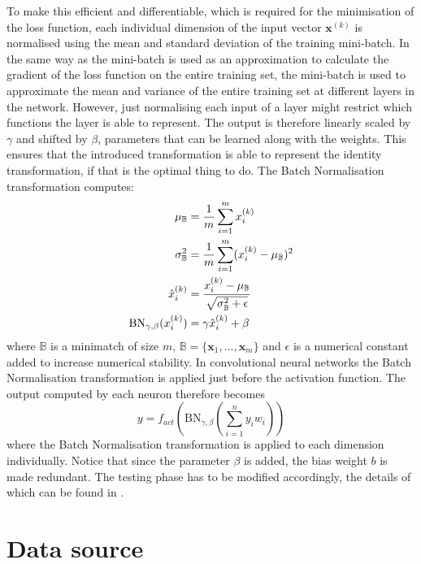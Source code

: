 \documentclass[12pt,a4paper,twoside,openright]{report}
\begin{document}
To make this efficient and differentiable, which is required for the minimisation of the loss function, each individual dimension of the input vector $\textbf{x}^{(k)}$ is normalised using the mean and standard deviation of the training mini-batch. In the same way as the mini-batch is used as an approximation to calculate the gradient of the loss function on the entire training set, the mini-batch is used to approximate the mean and variance of the entire training set at different layers in the network. However, just normalising each input of a layer might restrict which functions the layer is able to represent. The output is therefore linearly scaled by $\gamma$ and shifted by $\beta$, parameters that can be learned along with the weights. This ensures that the introduced transformation is able to represent the identity transformation, if that is the optimal thing to do. The Batch Normalisation transformation computes:
\begin{equation}
\begin{split}
	\mu_{\mathbb{B}}  & = \frac{1}{m}\sum_{i=1}^m x^{(k)}_i \\	
	\sigma^2_{\mathbb{B}}  & = \frac{1}{m}\sum_{i=1}^m (x^{(k)}_i - \mu_{\mathbb{B}})^2 \\	
	\hat{x}^{(k)}_i & = \cfrac{x^{(k)}_i - \mu_{\mathbb{B}}}{\sqrt{\sigma^2_{\mathbb{B}} + \epsilon}} \\
	\textrm{BN}_{\gamma, \beta}(x^{(k)}_i) & = \gamma \hat{x}^{(k)}_i + \beta
\end{split}
\end{equation}
where $\mathbb{B}$ is a minimatch of size $m$, $\mathbb{B} = \{ \textbf{x}_1, ... , \textbf{x}_m \}$ and $\epsilon$ is a numerical constant added to increase numerical stability.
In convolutional neural networks the Batch Normalisation transformation is applied just before the activation function. The output computed by each neuron therefore becomes
\begin{equation}
		y = f_{act}(\textrm{BN}_{\gamma, \beta}(\sum_{i=1}^{n} y_i w_i))
\end{equation}
where the Batch Normalisation transformation is applied to each dimension individually. Notice that since the parameter $\beta$ is added, the bias weight $b$ is made redundant. The testing phase has to be modified accordingly, the details of which can be found in \cite{batch_normalization}.

\section{Data source}
\end{document}
